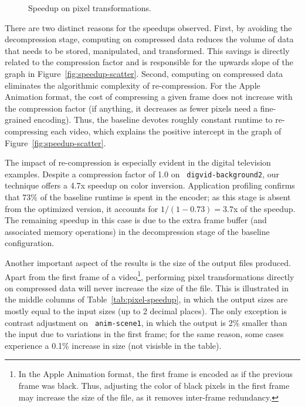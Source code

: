 \begin{figure}[t!]
\centering
{}
\caption[Speedup graph for pixel transformations]{Speedup on pixel transformations.
\protect\label{fig:pixel-speedup}}
\end{figure}

There are two distinct reasons for the speedups observed.  First, by
avoiding the decompression stage, computing on compressed data reduces
the volume of data that needs to be stored, manipulated, and
transformed.  This savings is directly related to the compression
factor and is responsible for the upwards slope of the graph in
Figure~\ref{fig:speedup-scatter}.  Second, computing on compressed
data eliminates the algorithmic complexity of re-compression.  For the
Apple Animation format, the cost of compressing a given frame does not
increase with the compression factor (if anything, it decreases as
fewer pixels need a fine-grained encoding).  Thus, the baseline
devotes roughly constant runtime to re-compressing each video, which
explains the positive intercept in the graph of
Figure~\ref{fig:speedup-scatter}.

The impact of re-compression is especially evident in the digital
television examples.  Despite a compression factor of 1.0 on {\tt
digvid-background2}, our technique offers a 4.7x speedup on color
inversion.  Application profiling confirms that 
73\% of the baseline runtime is spent in the encoder; as this stage is
absent from the optimized version, it accounts for $1/(1-0.73) = 3.7$x
of the speedup.  The remaining speedup in this case is due to the
extra frame buffer (and associated memory operations) in the
decompression stage of the baseline configuration.
%
%

Another important aspect of the results is the size of the output
files produced.  Apart from the first frame of a video\footnote{In the
Apple Animation format, the first frame is encoded as if the previous
frame was black.  Thus, adjusting the color of black pixels in the
first frame may increase the size of the file, as it removes
inter-frame redundancy.}, performing pixel transformations directly on
compressed data will never increase the size of the file.  This is
illustrated in the middle columns of Table~\ref{tab:pixel-speedup}, in
which the output sizes are mostly equal to the input sizes (up to 2
decimal places).  The only exception is contrast adjustment on {\tt
anim-scene1}, in which the output is 2\% smaller than the input due to
variations in the first frame; for the same reason, some cases
experience a 0.1\% increase in size (not visisble in the table).

